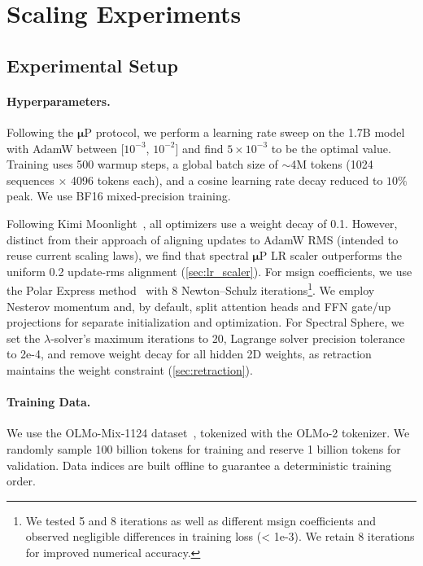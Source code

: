 \section{Scaling Experiments}

\subsection{Experimental Setup}

\paragraph{Hyperparameters.}
Following the $\boldsymbol{\mu}$P protocol, we perform a learning rate sweep on the 1.7B model with AdamW between [$10^{-3}$, $10^{-2}$] and find $5 \times 10^{-3}$ to be the optimal value.
Training uses 500 warmup steps, a global batch size of $\sim$4M tokens (1024 sequences $\times$ 4096 tokens each), and a cosine learning rate decay reduced to $10\%$ peak. We use BF16 mixed-precision training.

Following Kimi Moonlight~\citep{liu2025muonscalablellmtraining}, all optimizers use a weight decay of 0.1. However, distinct from their approach of aligning updates to AdamW RMS (intended to reuse current scaling laws), we find that spectral $\boldsymbol{\mu}$P LR scaler outperforms the uniform 0.2 update-rms alignment (\cref{sec:lr_scaler}).
For msign coefficients, we use the Polar Express method~\citep{amsel2025polarexpressoptimalmatrix} with 8 Newton–Schulz iterations\footnote{We tested 5 and 8 iterations as well as different msign coefficients and observed negligible differences in training loss (< 1e-3). We retain 8 iterations for improved numerical accuracy.}.
We employ Nesterov momentum and, by default, split attention heads and FFN gate/up projections for separate initialization and optimization. For Spectral Sphere, we set the $\lambda$-solver's maximum iterations to 20, Lagrange solver precision tolerance to 2e-4, and remove weight decay for all hidden 2D weights, as retraction maintains the weight constraint (\cref{sec:retraction}).

\paragraph{Training Data.}
We use the OLMo-Mix-1124 dataset~\citep{olmo20252olmo2furious}, tokenized with the OLMo-2 tokenizer. We randomly sample 100 billion tokens for training and reserve 1 billion tokens for validation. Data indices are built offline to guarantee a deterministic training order.

